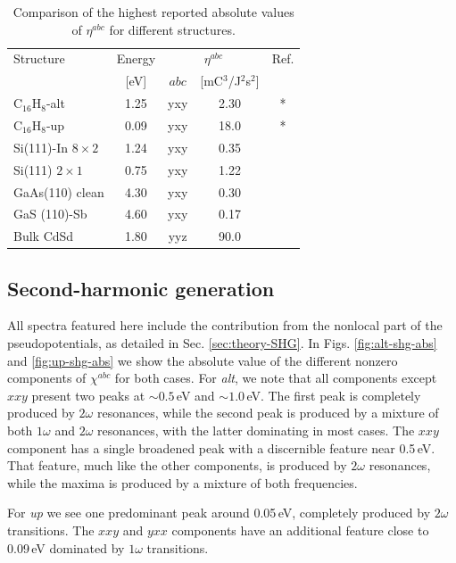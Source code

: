 \documentclass[pss]{wiley2sp} %
\begin{document}
\begin{table}%
  \sidecaption
  \begin{tabular}{lcccc}
  \hline
    Structure & Energy &  \multicolumn{2}{c}{$\eta^{abc}$} &  Ref.\\
    \cline{3-4}
              & [eV]   & $abc$ & [mC$^{3}$/J$^{2}$s$^{2}$] \\
    \hline
    C$_{16}$H$_{8}$-alt     & 1.25  & yxy & 2.30  & *     \\
    C$_{16}$H$_{8}$-up      & 0.09  & yxy & 18.0  & *     \\
    Si(111)-In $8\times2$   & 1.24  & yxy & 0.35  & \cite{arzatePRB14}  \\
    Si(111) $2\times1$      & 0.75  & yxy & 1.22  & \cite{mendozaPRB12} \\
    GaAs(110) clean         & 4.30  & yxy & 0.30  & \cite{nastosPRB07}     \\
    GaS (110)-Sb            & 4.60  & yxy & 0.17  & \cite{cabellosPRB11}\\
    Bulk CdSd               & 1.80  & yyz & 90.0  & \cite{lamanAPL99}  \\
  \hline
  \end{tabular}
  \caption[]{%
  Comparison of the highest reported absolute values of {$\eta^{abc}$} for 
    different structures.}
  \label{tab:etacomp}
\end{table}

\subsection{Second-harmonic generation}
All spectra featured here include the contribution from the nonlocal part of
the pseudopotentials, as detailed in Sec. \ref{sec:theory-SHG}. In Figs.
\ref{fig:alt-shg-abs} and \ref{fig:up-shg-abs} we show the absolute value of the different nonzero
components of $\chi^{abc}$ for both cases. For \emph{alt}, we note that all
components except $xxy$ present two peaks at $\sim0.5$\,eV and $\sim1.0$\,eV.
The first peak is completely produced by $2\omega$ resonances, while the
second peak is produced by a mixture of both $1\omega$ and $2\omega$
resonances, with the latter dominating in most cases. The $xxy$ component has
a single broadened peak with a discernible feature near 0.5\,eV. That feature,
much like the other components, is produced by $2\omega$ resonances, while the
maxima is produced by a mixture of both frequencies.

For \emph{up} we see one predominant peak around 0.05\,eV, completely produced
by $2\omega$ transitions. The $xxy$ and $yxx$ components have an additional
feature close to 0.09\,eV dominated by $1\omega$ transitions.
\end{document}
